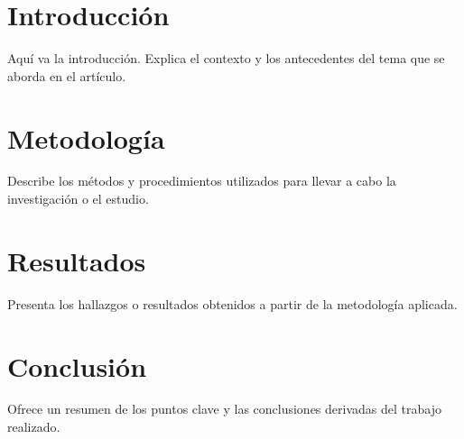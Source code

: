 \documentclass[twocolumn]{article}
\begin{document}

\section{Introducción}

Aquí va la introducción. Explica el contexto y los antecedentes del tema que se aborda en el artículo.

\section{Metodología}

Describe los métodos y procedimientos utilizados para llevar a cabo la investigación o el estudio.

\section{Resultados}

Presenta los hallazgos o resultados obtenidos a partir de la metodología aplicada.

\section{Conclusión}

Ofrece un resumen de los puntos clave y las conclusiones derivadas del trabajo realizado.
\end{document}
